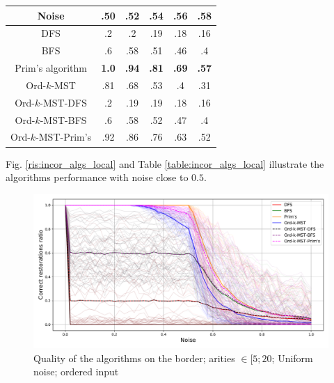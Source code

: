 \documentclass[11pt, tightenlines, twoside, onecolumn, nofloats, nobibnotes, nofootinbib, superscriptaddress, noshowpacks, centertags]{revtex4}
\begin{document}
\begin{minipage}[B]{0.49\textwidth}
        \centering
        \begin{tabular}{|c||c|c|c|c|c|}
            \hline
            Noise       &.50 &.52&.54&.56&.58\\
            \hline
            \hline
            DFS                 &.2  &.2 &.19 &.18 &.16\\
            \hline
            BFS                 &.6  &.58 &.51 &.46 &.4\\
            \hline
            Prim's algorithm &\textbf{1.0}  &\textbf{.94} &\textbf{.81} &\textbf{.69} &\textbf{.57} \\
            \hline
            Ord-$k$-MST         &.81  &.68 &.53 &.4 &.31\\
            \hline
            Ord-$k$-MST-DFS     &.2  &.19 &.19 &.18 &.16\\
            \hline
            Ord-$k$-MST-BFS     &.6  &.58 &.52 &.47 &.4 \\
            \hline
            Ord-$k$-MST-Prim's  &.92  &.86 &.76 &.63 &.52 \\
            \hline
        \end{tabular}
        \label{table:incor_algs_local}
\end{minipage}

Fig. \ref{ris:incor_algs_local} and Table \ref{table:incor_algs_local} illustrate the algorithms performance with noise close to $0.5$.

\begin{figure}
    \centering
    \includegraphics[scale=0.5]{./img/incor_algs_full_alpha006_maxarity_5_20.pdf}
    \caption{Quality of the algorithms on the border; arities $\in [5; 20$; Uniform noise; ordered input}
    \label{ris:incor_algs_full}
\end{figure}
\end{document}
